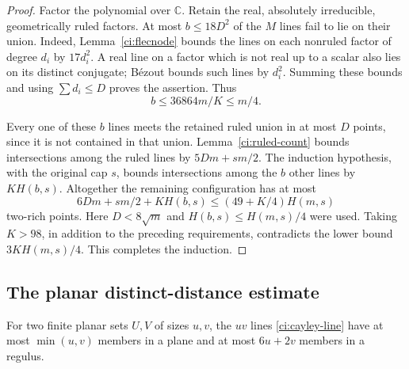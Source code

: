 \begin{proof}
Factor the polynomial over $\mathbb C$.  Retain the real,
absolutely irreducible, geometrically ruled factors.  At most
$b\le18D^2$ of the $M$ lines fail to lie on their union.  Indeed,
Lemma~\ref{ci:flecnode} bounds the lines on each nonruled factor
of degree $d_i$ by $17d_i^2$.  A real line on a factor which is
not real up to a scalar also lies on its distinct conjugate;
B\'ezout bounds such lines by $d_i^2$.  Summing these bounds and
using $\sum d_i\le D$ proves the assertion.  Thus
\[
 b\le36864m/K\le m/4.
\]

Every one of these $b$ lines meets the retained ruled union in at
most $D$ points, since it is not contained in that union.
Lemma~\ref{ci:ruled-count} bounds intersections among the ruled
lines by $5Dm+sm/2$.  The induction hypothesis, with the original
cap $s$, bounds intersections among the $b$ other lines by
$KH(b,s)$.  Altogether the remaining configuration has at most
\[
 6Dm+sm/2+KH(b,s)
 \le(49+K/4)H(m,s)
\]
two-rich points.  Here $D<8\sqrt m$ and
$H(b,s)\le H(m,s)/4$ were used.  Taking $K>98$, in addition to
the preceding requirements, contradicts the lower bound
$3KH(m,s)/4$.  This completes the induction.
\end{proof}

\subsection{The planar distinct-distance estimate}

\begin{lemma}\label{ci:cayley-caps}
For two finite planar sets $U,V$ of sizes $u,v$, the $uv$ lines
\eqref{ci:cayley-line} have at most $\min(u,v)$ members in a plane
and at most $6u+2v$ members in a regulus.
\end{lemma}

